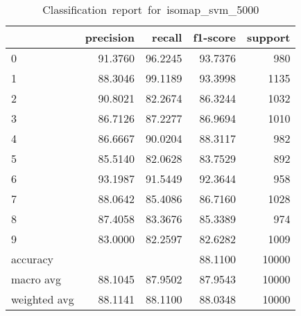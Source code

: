 \begin{table}[htb!]
    \centering
    \begin{tabular}{lrrrr}
        \toprule
                     & precision & recall  & f1-score & support \\
        \midrule
        0            & 91.3760   & 96.2245 & 93.7376  & 980     \\
        1            & 88.3046   & 99.1189 & 93.3998  & 1135    \\
        2            & 90.8021   & 82.2674 & 86.3244  & 1032    \\
        3            & 86.7126   & 87.2277 & 86.9694  & 1010    \\
        4            & 86.6667   & 90.0204 & 88.3117  & 982     \\
        5            & 85.5140   & 82.0628 & 83.7529  & 892     \\
        6            & 93.1987   & 91.5449 & 92.3644  & 958     \\
        7            & 88.0642   & 85.4086 & 86.7160  & 1028    \\
        8            & 87.4058   & 83.3676 & 85.3389  & 974     \\
        9            & 83.0000   & 82.2597 & 82.6282  & 1009    \\
        accuracy     &           &         & 88.1100  & 10000   \\
        macro avg    & 88.1045   & 87.9502 & 87.9543  & 10000   \\
        weighted avg & 88.1141   & 88.1100 & 88.0348  & 10000   \\
        \bottomrule
    \end{tabular}
    \caption{Classification\ report\ for\ isomap\_svm\_5000}
    \label{tab:classification-report-isomap_svm_5000}
\end{table}
